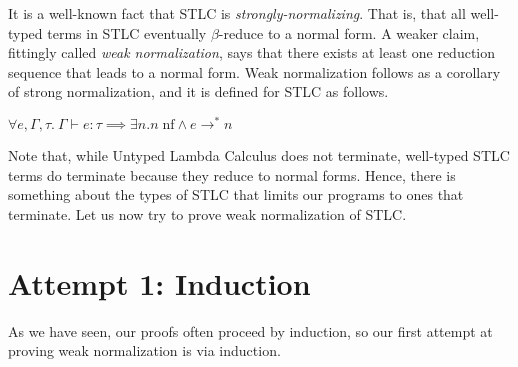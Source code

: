 \documentclass{lecturenotes}
\newcommand{\abs}[2]{\ensuremath{\lambda #1.\,#2}}
\newcommand{\app}[2]{\ensuremath{#1\;#2}}
\newcommand{\neutral}[1]{#1\;\text{ne}}
\newcommand{\nf}[1]{#1\;\text{nf}}
\newcommand{\proves}{\vdash}
\begin{document}

It is a well-known fact that STLC is \emph{strongly-normalizing}.
That is, that all well-typed terms in STLC eventually $\beta$-reduce to a normal form.
A weaker claim, fittingly called \emph{weak normalization}, says that there exists at least one reduction sequence that leads to a normal form.
Weak normalization follows as a corollary of strong normalization, and it is defined for STLC as follows.

\begin{thm}
  $\forall e, \Gamma, \tau.~\Gamma \proves e : \tau \implies \exists n. \nf{n} \land e \to^\ast n$
\end{thm}

Note that, while Untyped Lambda Calculus does not terminate, well-typed STLC terms do terminate because they reduce to normal forms.
Hence, there is something about the types of STLC that limits our programs to ones that terminate.
Let us now try to prove weak normalization of STLC.

\section{Attempt 1: Induction}

As we have seen, our proofs often proceed by induction, so our first attempt at proving weak normalization is via induction.
\end{document}
